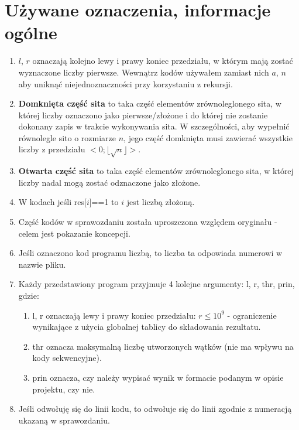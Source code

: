 \documentclass[12pt]{article}
\begin{document}
\section{Używane oznaczenia, informacje ogólne}
\begin{enumerate}
	\item \(l\), \(r\) oznaczają kolejno lewy i prawy koniec przedziału, w którym mają zostać wyznaczone liczby pierwsze. Wewnątrz kodów używałem zamiast nich \(a\), \(n\) aby uniknąć niejednoznaczności przy korzystaniu z rekursji.
	\item \textbf{Domknięta część sita} to taka część elementów zrównoleglonego sita, w której liczby oznaczono jako pierwsze/złożone i do której nie zostanie dokonany zapis w trakcie wykonywania sita. W szczególności, aby wypełnić równolegle sito o rozmiarze \(n\), jego część domknięta musi zawierać wszystkie liczby z przedziału \(<0;\lfloor\sqrt{n}\rfloor>\).
	\item \textbf{Otwarta część sita} to taka część elementów zrównoleglonego sita, w której liczby nadal mogą zostać odznaczone jako złożone.
	\item W kodach jeśli res[\(i\)]==1 to \(i\) jest liczbą złożoną.
	\item Część kodów w sprawozdaniu została uproszczona względem oryginału - celem jest pokazanie koncepcji.
	\item Jeśli oznaczono kod programu liczbą, to liczba ta odpowiada numerowi w nazwie pliku.
	\item Każdy przedstawiony program przyjmuje 4 kolejne argumenty: l, r, thr, prin, gdzie:
	\begin{enumerate}
		\item l, r oznaczają lewy i prawy koniec przedziału: \(r\le 10^9\) - ograniczenie wynikające z użycia globalnej tablicy do składowania rezultatu.
		\item thr oznacza maksymalną liczbę utworzonych wątków (nie ma wpływu na kody sekwencyjne).
		\item prin oznacza, czy należy wypisać wynik w formacie podanym w opisie projektu, czy nie.
	\end{enumerate}
	\item Jeśli odwołuję się do linii kodu, to odwołuje się do linii zgodnie z numeracją ukazaną w sprawozdaniu.
\end{enumerate}
\end{document}
